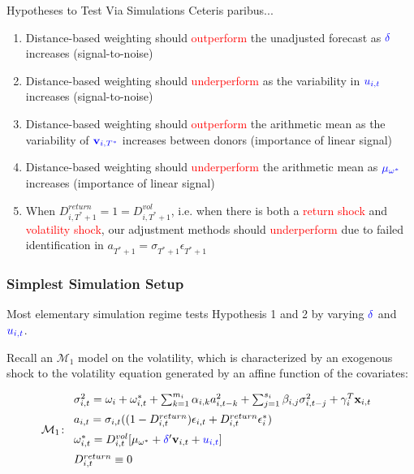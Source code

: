 \documentclass[9pt]{beamer}
\newcommand{\x}{\textbf{x}}
\def\mc#1{\mathcal{#1}} %
\def\mc#1{\mathcal{#1}}
\theoremstyle{definition}
\begin{document}
\begin{frame}{Hypotheses to Test Via Simulations}
    Ceteris paribus...
    \begin{enumerate}
        \item <1-> Distance-based weighting should \textcolor{red}{outperform} the unadjusted forecast as $\textcolor{blue}{\delta}$ increases (signal-to-noise)
        \item <2-> Distance-based weighting should \textcolor{red}{underperform} as the variability in $\textcolor{blue}{u_{i,t}}$ increases (signal-to-noise)
        \item <3-> Distance-based weighting should \textcolor{red}{outperform} the arithmetic mean as the variability of $\textcolor{blue}{\textbf{v}_{i,T^{*}}}$ increases between donors (importance of linear signal)
        \item <4-> Distance-based weighting should \textcolor{red}{underperform} the arithmetic mean as $\textcolor{blue}{\mu_{\omega^{*}}}$ increases (importance of linear signal)
        \item <5-> When $D^{return}_{i,T^{*}+1} = 1 = D^{vol}_{i,T^{*}+1}$, i.e. when there is both a \textcolor{red}{return shock} and \textcolor{red}{volatility shock}, our adjustment methods should \textcolor{red}{underperform} due to failed identification in $a_{T^{*}+1} = \sigma_{T^{*}+1}\epsilon_{T^{*}+1}$
    \end{enumerate}
\end{frame}

\begin{frame}
\fontsize{8pt}{9pt}

\frametitle{Simplest Simulation Setup}

Most elementary simulation regime tests Hypothesis 1 and 2 by varying $\textcolor{blue}{\delta}$ and $\textcolor{blue}{u_{i,t}}$.\\

\bigbreak

Recall an \hyperlink{model_1}{$\mc{M}_1$} model on the volatility, which is characterized by an exogenous shock to the volatility equation generated by an affine function of the covariates:

  \begin{align*}
    \mc{M}_1 \colon \begin{array}{l}
       \sigma^{2}_{i,t} = \omega_{i} + \omega^{*}_{i,t} + \sum^{m_{i}}_{k=1}\alpha_{i,k}a^{2}_{i,t-k} + \sum_{j=1}^{s_{i}}\beta_{i,j}\sigma_{i,t-j}^{2} + \gamma_{i}^{T} \x_{i,t} \text{ }\\[.2cm]
       a_{i,t} = \sigma_{i,t}((1-D^{return}_{i,t})\epsilon_{i,t} + D^{return}_{i,t}\epsilon^{*}_{i})\\[.2cm]
      \omega_{i,t}^{*} = D^{vol}_{i,t}[\mu_{\omega^{*}}+\textcolor{blue}{\delta}'\textbf{v}_{i, t}+ \textcolor{blue}{u_{i,t}}]\\[.2cm]
      D^{return}_{i,t} \equiv 0
    \end{array}
    \end{align*}

\end{frame}
\end{document}
